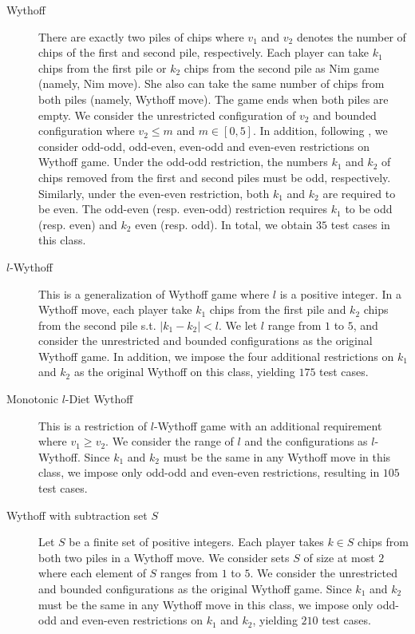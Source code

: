 \documentclass[review]{elsarticle}
\begin{document}
\begin{description}
	\item[Wythoff]
	There are exactly two piles of chips where $v_1$ and $v_2$ denotes the number of chips of the first and second pile, respectively. %
	Each player can take $k_1$ chips from the first pile or $k_2$ chips from the second pile as Nim game (namely, Nim move).
	She also can take the same number of chips from both piles (namely, Wythoff move).
	The game ends when both piles are empty.
	We consider the unrestricted configuration of $v_2$ and bounded configuration where $v_2 \leq m$ and $m \in [0, 5]$.
	In addition, following \citet{LiuZ2015}, we consider odd-odd, odd-even, even-odd and even-even restrictions on Wythoff game.
	Under the odd-odd restriction, the numbers $k_1$ and $k_2$ of chips removed from the first and second piles must be odd, respectively.
	Similarly, under the even-even restriction, both $k_1$ and $k_2$ are required to be even.
	The odd-even (resp. even-odd) restriction requires $k_1$ to be odd (resp. even) and $k_2$ even (resp. odd).
	In total, we obtain $35$ test cases in this class.	
	
	\item[$l$-Wythoff]
	This is a generalization of Wythoff game where $l$ is a positive integer.
	In a Wythoff move, each player take $k_1$ chips from the first pile and $k_2$ chips from the second pile s.t. $|k_1 - k_2| < l$.
	We let $l$ range from $1$ to $5$, and consider the unrestricted and bounded configurations as the original Wythoff game.
	In addition, we impose the four additional restrictions on $k_1$ and $k_2$ as the original Wythoff on this class, yielding $175$ test cases.
	
	\item[Monotonic $l$-Diet Wythoff]
	This is a restriction of $l$-Wythoff game with an additional requirement where $v_1 \geq v_2$.
	We consider the range of $l$ and the configurations as $l$-Wythoff.
	Since $k_1$ and $k_2$ must be the same in any Wythoff move in this class, we impose only odd-odd and even-even restrictions, resulting in $105$ test cases.
	
	\item[Wythoff with subtraction set $S$]
	Let $S$ be a finite set of positive integers.
	Each player takes $k \in S$ chips from both two piles in a Wythoff move.
	We consider sets $S$ of size at most $2$ where each element of $S$ ranges from $1$ to $5$.
	We consider the unrestricted and bounded configurations as the original Wythoff game.
	Since $k_1$ and $k_2$ must be the same in any Wythoff move in this class, we impose only odd-odd and even-even restrictions on $k_1$ and $k_2$, yielding $210$ test cases.
	

\end{description}
\end{document}
